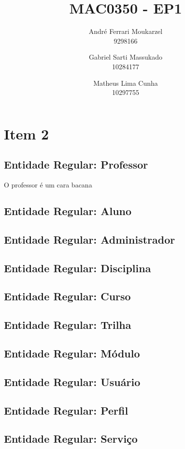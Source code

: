 \documentclass{article}
\title{MAC0350 - EP1}
\date{}
\author{
	Andr\'e Ferrari Moukarzel \\ 9298166
	\and 
	Gabriel Sarti Massukado \\ 10284177
	\and
	Matheus Lima Cunha \\ 10297755
}
\begin{document}
  \maketitle
  \newpage
  
  \section{Item 2}
  	\subsection{Entidade Regular: Professor}
  		\quad O professor é um cara bacana
  	\subsection{Entidade Regular: Aluno}
  	\subsection{Entidade Regular: Administrador}
  	\subsection{Entidade Regular: Disciplina}
  	\subsection{Entidade Regular: Curso}
  	\subsection{Entidade Regular: Trilha}
  	\subsection{Entidade Regular: M\'odulo}
  	\subsection{Entidade Regular: Usu\'ario}
  	\subsection{Entidade Regular: Perfil}
  	\subsection{Entidade Regular: Servi\c{c}o}
\end{document}
